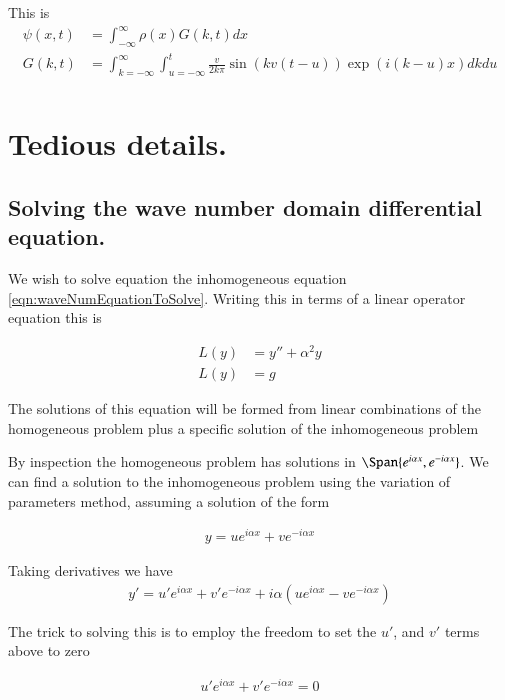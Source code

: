 \documentclass{article}
\newcommand{\IIinf}[0]{ \int_{-\infty}^\infty }
\begin{document}
This is
\begin{align*}
{\psi}(x, t) 
&= 
\IIinf {\rho}(x) G( k, t ) dx \\
G(k, t) &=
\int_{k=-\infty}^\infty
\int_{u = -\infty}^t 
\frac{v}{2 k \pi}
\sin( k v (t-u) ) 
\exp( i (k-u) x ) 
dk 
du 
\\
\end{align*}

\section{ Tedious details. }

\subsection{ Solving the wave number domain differential equation. }

We wish to solve equation the inhomogeneous equation \ref{eqn:waveNumEquationToSolve}.  Writing this in terms of a linear operator equation this is

\begin{align*}
L(y) &= y'' + \alpha^2 y \\
L(y) &= g
\end{align*}

The solutions of this equation will be formed from linear combinations of the homogeneous problem plus a specific solution of the inhomogeneous problem

By inspection the homogeneous problem has solutions in $\Span \{ e^{ i \alpha x }, e^{ -i \alpha x }\}$.
We can find a solution to the inhomogeneous problem using the variation of parameters method, assuming a solution of the form

\begin{align*}
y  = u e^{ i \alpha x } + v e^{ -i \alpha x } 
\end{align*}

Taking derivatives we have
\begin{align*}
y' = u' e^{ i \alpha x } + v' e^{ -i \alpha x } + i \alpha (u e^{ i \alpha x } - v e^{ -i \alpha x })
\end{align*}

The trick to solving this is to employ the freedom to set the $u'$, and $v'$ terms above to zero

\begin{align}\label{eqn:firstConstraint}
u' e^{ i \alpha x } + v' e^{ -i \alpha x } = 0 
\end{align}
\end{document}
